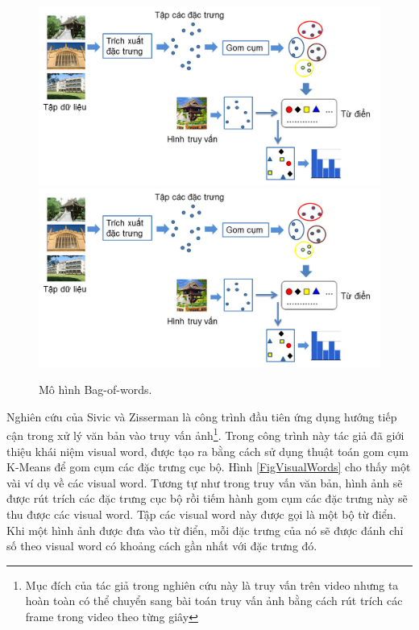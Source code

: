 \begin{figure}[!htbp]
  \begin{center}
    \leavevmode
    \ifpdf
      \includegraphics[scale=0.32]{bow}
    \else
      \includegraphics[scale=0.32]{bow}
    \fi
    \caption[Mô hình Bag-of-words]{Mô hình Bag-of-words.}
    \label{FigBoW}
  \end{center}
\end{figure}

Nghiên cứu của Sivic và Zisserman \cite{sivic2003video} là công trình đầu tiên ứng dụng hướng tiếp cận trong xử lý văn bản vào truy vấn ảnh\footnote{Mục đích của tác giả trong nghiên cứu này là truy vấn trên video nhưng ta hoàn toàn có thể chuyển sang bài toán truy vấn ảnh bằng cách rút trích các frame trong video theo từng giây}. Trong công trình này tác giả đã giới thiệu khái niệm visual word, được tạo ra bằng cách sử dụng thuật toán gom cụm K-Means để gom cụm các đặc trưng cục bộ. Hình \ref{FigVisualWords} cho thấy một vài ví dụ về các visual word. Tương tự như trong truy vấn văn bản, hình ảnh sẽ được rút trích các đặc trưng cục bộ rồi tiếm hành gom cụm các đặc trưng này sẽ thu được các visual word. Tập các visual word này được gọi là một bộ từ điển. Khi một hình ảnh được đưa vào từ điển, mỗi đặc trưng của nó sẽ được đánh chỉ số theo visual word có khoảng cách gần nhất với đặc trưng đó.


